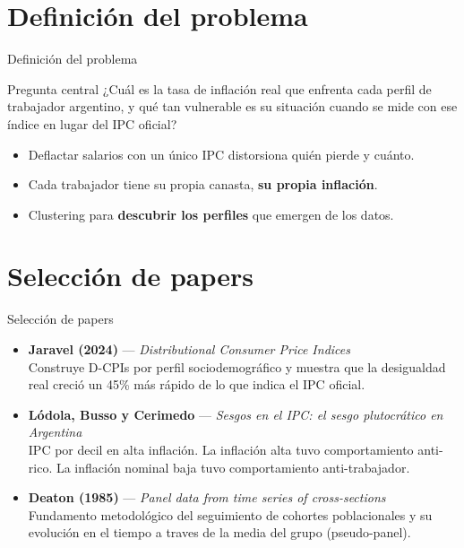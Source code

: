 \documentclass{beamer}
\begin{document}
\section{Definición del problema}
\begin{frame}{Definición del problema}
    \begin{block}{Pregunta central}
        ¿Cuál es la tasa de inflación real que enfrenta cada perfil de trabajador argentino, y qué tan vulnerable es su situación cuando se mide con ese índice en lugar del IPC oficial?
    \end{block}
    \vspace{0.5em}
    \begin{itemize}
        \item Deflactar salarios con un único IPC distorsiona quién pierde y cuánto.
        \item Cada trabajador tiene su propia canasta, \textbf{su propia inflación}.
        \item Clustering para \textbf{descubrir los perfiles} que emergen de los datos.
    \end{itemize}
\end{frame}


\section{Selección de papers}
\begin{frame}{Selección de papers}
    \begin{itemize}
        \item \textbf{Jaravel (2024)} --- \textit{Distributional Consumer Price Indices}\\
        Construye D-CPIs por perfil sociodemográfico y muestra que la desigualdad real creció un 45\% más rápido de lo que indica el IPC oficial.
        \vspace{0.4em}
        \item \textbf{Lódola, Busso y Cerimedo} --- \textit{Sesgos en el IPC: el sesgo plutocrático en Argentina}\\
        IPC por decil en alta inflación. La inflación alta tuvo comportamiento anti-rico. La inflación nominal baja tuvo comportamiento anti-trabajador.
        \vspace{0.4em}
        \item \textbf{Deaton (1985)} --- \textit{Panel data from time series of cross-sections}\\
        Fundamento metodológico del seguimiento de cohortes poblacionales y su evolución en el tiempo a traves de la media del grupo (pseudo-panel).
    \end{itemize}
\end{frame}
\end{document}
